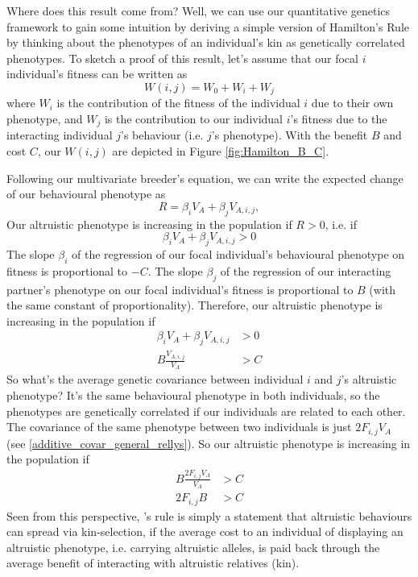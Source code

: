 Where does this result come from? Well, we can use our quantitative genetics framework to gain some 
intuition by deriving a simple version of Hamilton's Rule by thinking
about the phenotypes of an individual's kin as genetically correlated
phenotypes. To sketch a proof of this result, let's assume that our focal $i$ individual's fitness can be written as 
\begin{equation}
W(i,j)= W_0 + W_i +W_j
\end{equation}
where $W_i$ is the contribution of the fitness of the individual $i$ due
to their own phenotype, and $W_j$ is the contribution to our
individual $i$'s fitness due to the interacting individual $j$'s behaviour (i.e. $j$'s phenotype).
With the benefit $B$ and cost $C$, our $W(i,j)$ are depicted in Figure \ref{fig:Hamilton_B_C}. 

Following our multivariate breeder's equation, we can write the expected change of our behavioural phenotype as 
\begin{equation}
R = \beta_i V_A + \beta_j V_{A,i,j},
\end{equation}
Our altruistic phenotype is increasing in the population if $R>0$, i.e. if 
\begin{equation}
  \beta_i V_A + \beta_j V_{A,i,j}  > 0 \end{equation}
 The slope $\beta_i$ of the regression of our focal individual's
behavioural phenotype on fitness is proportional to $-C$. The slope
$\beta_j$ of the regression of our interacting partner's phenotype on
our focal individual's fitness is proportional to $B$ (with the same
constant of proportionality). Therefore, our altruistic phenotype is increasing in the population if
\begin{eqnarray}
  \beta_i V_A + \beta_j V_{A,i,j} & > 0  \nonumber  \\
 B \frac{V_{A,i,j}}{V_A} & >  C  \label{eqn:Covar_Hamilton}
\end{eqnarray}
So what's the average genetic covariance between
individual $i$ and $j$'s altruistic phenotype? It's the same
behavioural phenotype in both individuals, so the phenotypes are
genetically correlated if our individuals are related to each
other. The covariance of the same phenotype between two individuals is
just $2 F_{i,j} V_A$ (see \eqref{additive_covar_general_rellys}). So
our altruistic phenotype is increasing in the population if
\begin{align}
   B\frac{2 F_{i,j} V_A}{V_A} &> C \nonumber  \\
  2 F_{i,j} B & > C \label{eqn:Hamiltons_rule}
\end{align}
Seen from this perspective, \citeauthor{hamilton1964genetical}'s rule
is simply a statement that altruistic behaviours can spread via
kin-selection, if the average cost to an individual of displaying an
altruistic phenotype, i.e. carrying altruistic alleles, is paid back through the average benefit of interacting with altruistic relatives (kin).

